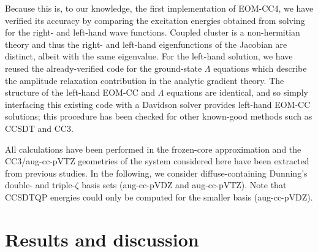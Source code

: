 \documentclass[aip,jcp,reprint,noshowkeys,superscriptaddress]{revtex4-1}
\begin{document}
Because this is, to our knowledge, the first implementation of EOM-CC4, we have verified its accuracy by comparing the excitation energies obtained from solving for the right- and left-hand wave functions. 
Coupled cluster is a non-hermitian theory and thus the right- and left-hand eigenfunctions of the Jacobian are distinct, albeit with the same eigenvalue. 
For the left-hand solution, we have reused the already-verified code for the ground-state $\Lambda$	equations which describe the amplitude relaxation contribution in the analytic gradient theory. \cite{Matthews_2021} 
The structure of the left-hand EOM-CC and $\Lambda$ equations are identical, and so simply interfacing this existing code with a Davidson solver \cite{Davidson_1975} provides left-hand EOM-CC solutions; this procedure has been checked for other known-good methods such as CCSDT and CC3.

All calculations have been performed in the frozen-core approximation and the CC3/aug-cc-pVTZ geometries of the system considered here have been extracted from previous studies. \cite{Loos_2018a,Chrayteh_2021}
In the following, we consider diffuse-containing Dunning's double- and triple-$\zeta$ basis sets (aug-cc-pVDZ and aug-cc-pVTZ).
Note that CCSDTQP energies could only be computed for the smaller basis (aug-cc-pVDZ).

\section{Results and discussion}
\end{document}
